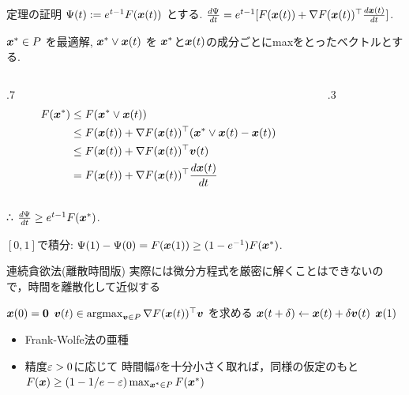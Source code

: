 \documentclass[14pt,aspectratio=169,xcolor=dvipsnames,table,onlytextwidth,dvipdfmx]{beamer}
\begin{document}
\begin{frame}{定理の証明}
    \small
$\Psi(t) := e^{t-1}F(\boldsymbol{x}(t))$ とする.
$\frac{d\Psi}{dt} = e^{t-1}[F(\boldsymbol{x}(t)) + \nabla F(\boldsymbol{x}(t))^\top \frac{d\boldsymbol{x}(t)}{dt}]$.

\vfill
$\boldsymbol{x}^* \in P$ を最適解,  $\boldsymbol{x}^* \vee \boldsymbol{x}(t)$ を $\boldsymbol{x}^*$と$\boldsymbol{x}(t)$の成分ごとにmaxをとったベクトルとする.

\begin{columns}
    \begin{column}{.7\linewidth}
\begin{align*}
    F(\boldsymbol{x}^*)
    &\leq F(\boldsymbol{x}^* \vee \boldsymbol{x}(t)) \\
    &\leq F(\boldsymbol{x}(t)) + \nabla F(\boldsymbol{x}(t))^\top (\boldsymbol{x}^* \vee \boldsymbol{x}(t) - \boldsymbol{x}(t)) \\
    &\leq F(\boldsymbol{x}(t)) + \nabla F(\boldsymbol{x}(t))^\top \boldsymbol{v}(t) \\
    &= F(\boldsymbol{x}(t)) + \nabla F(\boldsymbol{x}(t))^\top \dfrac{d\boldsymbol{x}(t)}{dt}
\end{align*}
    \end{column}
    \begin{column}{.3\linewidth}
    \end{column}
\end{columns}

∴ $\frac{d\Psi}{dt} \geq e^{t-1}F(\boldsymbol{x}^*)$.

\vfill
$[0,1]$で積分: $\Psi(1)-\Psi(0) = F(\boldsymbol{x}(1)) \geq (1-e^{-1})F(\boldsymbol{x}^*)$.
\end{frame}

\begin{frame}{連続貪欲法(離散時間版)}
    実際には微分方程式を厳密に解くことはできないので，時間を離散化して近似する

    \begin{block}{}
    \begin{algorithmic}[1]
        \STATE $\boldsymbol{x}(0) = \mathbf{0}$
            \STATE $\boldsymbol{v}(t) \in  \operatorname{argmax}_{\boldsymbol{v} \in P} \nabla F(\boldsymbol{x}(t))^\top \boldsymbol{v}$ を求める
            \STATE $\boldsymbol{x}(t+\delta) \gets \boldsymbol{x}(t) + \delta \boldsymbol{v}(t)$
        \ENDFOR
        \RETURN $\boldsymbol{x}(1)$
    \end{algorithmic}
    \end{block}

    \begin{itemize}
        \item Frank-Wolfe法の亜種
        \item 精度$\varepsilon>0$に応じて 時間幅$\delta$を十分小さく取れば，同様の仮定のもと $F(\boldsymbol{x}) \geq (1-1/e-\varepsilon) \max_{\boldsymbol{x}^* \in P}F(\boldsymbol{x}^*)$
    \end{itemize}
\end{frame}
\end{document}
